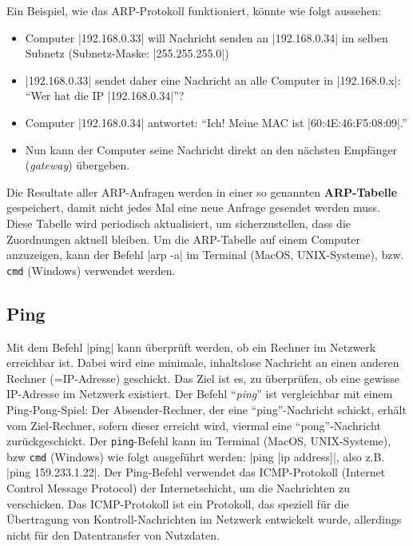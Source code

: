 Ein Beispiel, wie das \gls{ARP}-Protokoll funktioniert, könnte wie folgt aussehen:
\begin{itemize}
	\item Computer \commandbox|192.168.0.33| will Nachricht senden an \commandbox|192.168.0.34| im selben Subnetz (Subnetz-Maske: \commandBluebox|255.255.255.0|)
	\item \commandbox|192.168.0.33| sendet daher eine Nachricht an alle Computer in \commandbox|192.168.0.x|: \enquote{Wer hat die IP \commandbox|192.168.0.34|}?
	\item Computer \commandbox|192.168.0.34| antwortet: \enquote{Ich! Meine MAC ist \commandbox|60:4E:46:F5:08:09|.}
	\item Nun kann der Computer seine Nachricht direkt an den nächsten Empfänger (\textit{gateway}) übergeben.
\end{itemize}

Die Resultate aller \gls{ARP}-Anfragen werden in einer so genannten \textbf{ARP-Tabelle} gespeichert, damit nicht jedes Mal eine neue Anfrage gesendet werden muss. Diese Tabelle wird periodisch aktualisiert, um sicherzustellen, dass die Zuordnungen aktuell bleiben. Um die \gls{ARP}-Tabelle auf einem Computer anzuzeigen, kann der Befehl \commandbox*|arp -a| im Terminal (MacOS, UNIX-Systeme), bzw. \texttt{cmd} (Windows) verwendet werden.

\subsection{Ping}
Mit dem Befehl \commandbox*|ping| kann überprüft werden, ob ein Rechner im Netzwerk erreichbar ist. Dabei wird eine minimale, inhaltslose Nachricht an einen anderen Rechner (=\gls{IP}-Adresse) geschickt. Das Ziel ist es, zu überprüfen, ob eine gewisse \gls{IP}-Adresse im Netzwerk existiert. Der Befehl \enquote{\textit{ping}} ist vergleichbar mit einem Ping-Pong-Spiel: Der Absender-Rechner, der eine \enquote{ping}-Nachricht schickt, erhält vom Ziel-Rechner, sofern dieser erreicht wird, viermal eine \enquote{pong}-Nachricht zurückgeschickt. Der \texttt{ping}-Befehl kann im Terminal (MacOS, UNIX-Systeme), bzw \texttt{cmd} (Windows) wie folgt ausgeführt werden: \commandbox*|ping [ip address]|, also z.B. \commandbox*|ping 159.233.1.22|. Der Ping-Befehl verwendet das \gls{ICMP}-Protokoll (Internet Control Message Protocol) der Internetschicht, um die Nachrichten zu verschicken. Das \gls{ICMP}-Protokoll ist ein Protokoll, das speziell für die Übertragung von Kontroll-Nachrichten im Netzwerk entwickelt wurde, allerdings nicht für den Datentransfer von Nutzdaten.

